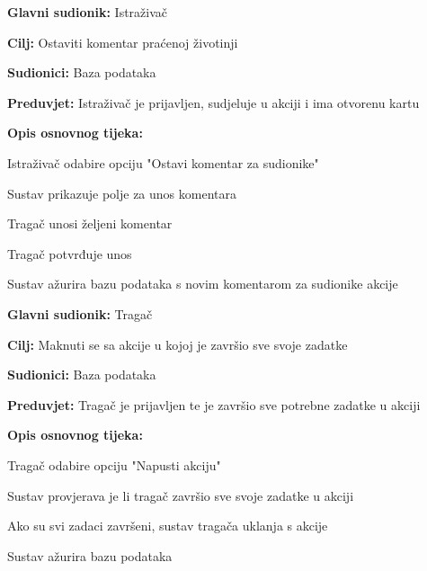					\noindent {}
					\begin{packed_item}
						
						\item \textbf{Glavni sudionik: }Istraživač
						\item  \textbf{Cilj:} Ostaviti komentar praćenoj životinji 
						\item  \textbf{Sudionici:} Baza podataka
						\item  \textbf{Preduvjet:} Istraživač je prijavljen, sudjeluje u akciji i ima otvorenu kartu
						\item  \textbf{Opis osnovnog tijeka:}
						
						\item[] \begin{packed_enum}
							
							\item Istraživač odabire opciju "Ostavi komentar za sudionike" 
							\item Sustav prikazuje polje za unos komentara 
							\item Tragač unosi željeni komentar 
							\item Tragač potvrđuje unos 
							\item Sustav ažurira bazu podataka s novim komentarom za sudionike akcije 
						\end{packed_enum}
					\end{packed_item}
					
					\noindent \underbar{\textbf{UC12 -Micanje s akcije}}
					\begin{packed_item}
						
						\item \textbf{Glavni sudionik: }Tragač
						\item  \textbf{Cilj:} Maknuti se sa akcije u kojoj je završio sve svoje zadatke 
						\item  \textbf{Sudionici:} Baza podataka
						\item  \textbf{Preduvjet:} Tragač je prijavljen te je završio sve potrebne zadatke u akciji 
						\item  \textbf{Opis osnovnog tijeka:}
						
						\item[] \begin{packed_enum}
							
							\item Tragač odabire opciju "Napusti akciju" 
							\item Sustav provjerava je li tragač završio sve svoje zadatke u akciji 
							\item Ako su svi zadaci završeni, sustav tragača uklanja s akcije 
							\item Sustav ažurira bazu podataka 
						\end{packed_enum}
					\end{packed_item}
					
